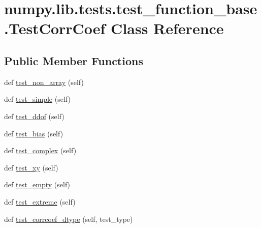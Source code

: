 \hypertarget{classnumpy_1_1lib_1_1tests_1_1test__function__base_1_1TestCorrCoef}{}\section{numpy.\+lib.\+tests.\+test\+\_\+function\+\_\+base.\+Test\+Corr\+Coef Class Reference}
\label{classnumpy_1_1lib_1_1tests_1_1test__function__base_1_1TestCorrCoef}
\subsection*{Public Member Functions}
\begin{DoxyCompactItemize}
\item 
def \hyperlink{classnumpy_1_1lib_1_1tests_1_1test__function__base_1_1TestCorrCoef_ab3d0342e0bae527c064cd8dffc1060ee}{test\+\_\+non\+\_\+array} (self)
\item 
def \hyperlink{classnumpy_1_1lib_1_1tests_1_1test__function__base_1_1TestCorrCoef_aa16adb6680075715f33eb5b0c4a09dfe}{test\+\_\+simple} (self)
\item 
def \hyperlink{classnumpy_1_1lib_1_1tests_1_1test__function__base_1_1TestCorrCoef_aeb2a2e91ea980a9ef3745496c0f9acc3}{test\+\_\+ddof} (self)
\item 
def \hyperlink{classnumpy_1_1lib_1_1tests_1_1test__function__base_1_1TestCorrCoef_ae939abb8af1d57effcf16b295e9bed58}{test\+\_\+bias} (self)
\item 
def \hyperlink{classnumpy_1_1lib_1_1tests_1_1test__function__base_1_1TestCorrCoef_ad4bd82a443ce678de8519834dcbb740f}{test\+\_\+complex} (self)
\item 
def \hyperlink{classnumpy_1_1lib_1_1tests_1_1test__function__base_1_1TestCorrCoef_ab2a4b181ae888a2f210bdfaaa5022ec9}{test\+\_\+xy} (self)
\item 
def \hyperlink{classnumpy_1_1lib_1_1tests_1_1test__function__base_1_1TestCorrCoef_afe5ebf695f7fddf305854baed489f113}{test\+\_\+empty} (self)
\item 
def \hyperlink{classnumpy_1_1lib_1_1tests_1_1test__function__base_1_1TestCorrCoef_a27ac599a251be1127b6bac0617c56d64}{test\+\_\+extreme} (self)
\item 
def \hyperlink{classnumpy_1_1lib_1_1tests_1_1test__function__base_1_1TestCorrCoef_a4028db0a990b71f99aaaa1c737b3c9d7}{test\+\_\+corrcoef\+\_\+dtype} (self, test\+\_\+type)
\end{DoxyCompactItemize}
